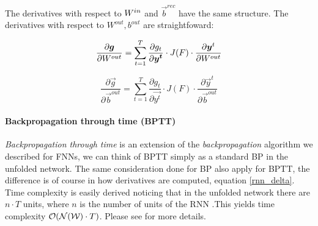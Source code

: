 The derivatives with respect to $W^{in}$ and $\vec{b}^{rec}$ have the same structure.
The derivatives with respect to $W^{out}, b^{out}$ are straightfoward:

\begin{equation}
\frac{\partial \boldsymbol{g}}{\partial W^{out}} = \sum_{t=1}^T \frac{\partial g_t}{\partial \boldsymbol{y^t}} \cdot J(F) \cdot \frac{\partial \boldsymbol{y}^t}{\partial W^{out}} 
\end{equation}

\begin{equation}
\frac{\partial \vec{g}}{\partial \vec{b}^{out}} = \sum_{t=1}^T \frac{\partial g_t}{\partial \vec{y^t}} \cdot J(F) \cdot \frac{\partial \vec{y}^t}{\partial \vec{b}^{out}} 
\end{equation}

\paragraph{Backpropagation through time (BPTT)}
\textit{Backpropagation through time} is an extension of the \textit{backpropagation} algorithm we described for FNNs, we can think of BPTT
simply as a standard BP in the unfolded network. The same consideration done for BP also apply for BPTT, the difference is of course in how derivatives
are computed, equation \ref{rnn_delta}. Time complexity is easily derived noticing that in the unfolded network there are $n \cdot T$ units, where $n$ is the number of units of the RNN .This
yields time complexity $\mathcal{O}(\mathcal{N}(\mathcal{W})\cdot T)$. Please see \cite{Williams90anefficient} for more details.






